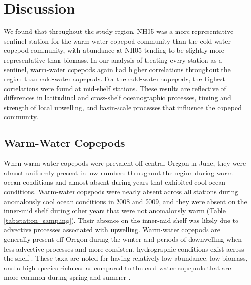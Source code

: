 \documentclass[preprint, authoryear, 12pt]{elsarticle}
\begin{document}
\section{Discussion}

We found that throughout the study region, NH05 was a more representative sentinel station for the warm-water copepod community than the cold-water copepod community, with abundance at NH05 tending to be slightly more representative than biomass.  In our analysis of treating every station as a sentinel, warm-water copepods again had higher correlations throughout the region than cold-water copepods.  For the cold-water copepods, the highest correlations were found at mid-shelf stations.  These results are reflective of differences in latitudinal and cross-shelf oceanographic processes, timing and strength of local upwelling, and basin-scale processes that influence the copepod community.   

\subsection{Warm-Water Copepods}

When warm-water copepods were prevalent off central Oregon in June, they were almost uniformly present in low numbers throughout the region during warm ocean conditions and almost absent during years that exhibited cool ocean conditions. Warm-water copepods were nearly absent across all stations during anomalously cool ocean conditions in 2008 and 2009, and they were absent on the inner-mid shelf during other years that were not anomalously warm (Table \ref{tab:station_sampling}). Their absence on the inner-mid shelf was likely due to advective processes associated with upwelling.   Warm-water copepods are generally present off Oregon during the winter and periods of downwelling when less advective processes and more consistent hydrographic conditions exist across the shelf \citep{keister2003zonal, keister2011zooplankton}. These taxa are noted for having relatively low abundance, low biomass, and a high species richness as compared to the cold-water copepods that are more common during spring and summer \citep{peterson1977seasonal}.  
\end{document}
